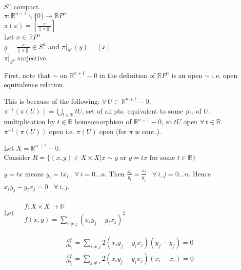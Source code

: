 
$S^n$ compact. \\
$\pi :\mathbb{R}^{n+1}\backslash \lbrace 0 \rbrace \to \mathbb{R}P^n$ \\
$\pi(x) = [ \frac{x}{ \| x \| } ]$ \\
Let $x \in \mathbb{R}P^n$ \\
\phantom{Let } $y = \frac{x}{ \| x \| } \in S^n$ and $ \left. \pi \right|_{S^n}(y) = [x]$ \\
$\left. \pi \right|_{S^n}$ surjective.  




First, note that $\sim $ on $\mathbb{R}^{n+1} -0$ in the definition of $\mathbb{R}P^n$ is an open $\sim$ i.e. open equivalence relation.  

This is because of the following:
$\forall \, U \subset \mathbb{R}^{n+1}-0$, \\
$\pi^{-1}(\pi(U)) = \bigcup_{t\in \mathbb{R}} tU$, set of all pts. equivalent to some pt. of $U$.  \\
multiplication by $t\in \mathbb{R}$ homeomorphism of $\mathbb{R}^{n+1} - 0$, so $tU$ open $\forall \, t \in \mathbb{R}$.  \\
$\pi^{-1}(\pi(U))$ open i.e. $\pi(U)$ open (for $\pi$ is cont.).  


Let $X = \mathbb{R}^{n+1} -0$.  \\
Consider $R = \lbrace ( x,y) \in X \times X | x\sim y \text{ or } y = tx \text{ for some } t \in \mathbb{R} \rbrace$ 

$y = tx$ means $y_i = tx_i$ \, $\forall \, i = 0\dots n$.  Then $\frac{ x_i}{y_i} = \frac{ x_j}{ y_j}$ \, $\forall \, i,j = 0 \dots n$.  Hence $x_i y_j - y_i x_j = 0$ \, $\forall \, i , j$.  

Let $\begin{aligned} & \quad \\ 
  & f : X \times X \to \mathbb{R} \\
  & f(x,y) = \sum_{ i \neq j} (x_i y_j - y_i x_j)^2 \end{aligned}$  

\[
\begin{aligned}
  & \frac{ \partial f}{ \partial x_i} = \sum_{i \neq j } 2 (x_i y_j - y_i x_j) ( y_j - y_j) = 0 \\
  & \frac{ \partial f}{ \partial y_j} = \sum_{j \neq i } 2 (x_i y_j - y_i x_j) ( x_i - x_i) = 0 
\end{aligned}
\]

